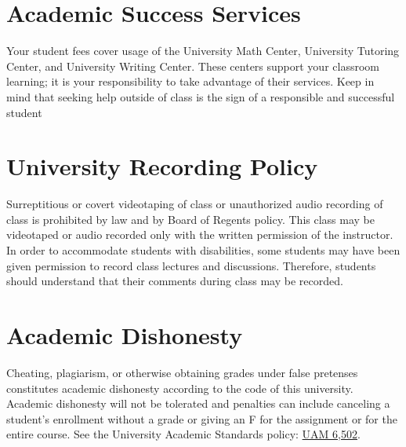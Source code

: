 \documentclass[11pt,onecolumn]{article}
\begin{document}
\section*{Academic Success Services}
Your student fees cover usage of the University Math Center, University Tutoring Center, and University Writing Center. These centers support your classroom learning; it is your responsibility to take advantage of their services. Keep in mind that seeking help outside of class is the sign of a responsible and successful student

\section*{University Recording Policy}
Surreptitious or covert videotaping of class or unauthorized audio recording of class is prohibited by law and by Board of Regents policy. This class may be videotaped or audio recorded only with the written permission of the instructor. In order to accommodate students with disabilities, some students may have been given permission to record class lectures and discussions. Therefore, students should understand that their comments during class may be recorded.

\section*{Academic Dishonesty}
Cheating, plagiarism, or otherwise obtaining grades under false pretenses constitutes academic dishonesty according to the code of this university. Academic dishonesty will not be tolerated and penalties can include canceling a student’s enrollment without a grade or giving an F for the assignment or for the entire course. See the University Academic Standards policy: \href{https://www.unr.edu/administrative-manual/6000-6999-curricula-teaching-research/instruction-research-procedures/6502-academic-standards}{UAM 6,502}.
\end{document}

